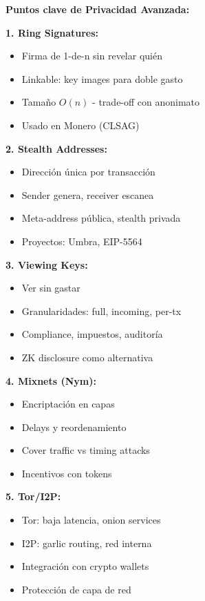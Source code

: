 \documentclass[11pt,a4paper,twoside]{book}
\begin{document}
\begin{keyidea}
\textbf{Puntos clave de Privacidad Avanzada:}

\textbf{1. Ring Signatures:}
\begin{itemize}
    \item Firma de 1-de-n sin revelar qui\'en
    \item Linkable: key images para doble gasto
    \item Tama\~no $O(n)$ - trade-off con anonimato
    \item Usado en Monero (CLSAG)
\end{itemize}

\textbf{2. Stealth Addresses:}
\begin{itemize}
    \item Direcci\'on \'unica por transacci\'on
    \item Sender genera, receiver escanea
    \item Meta-address p\'ublica, stealth privada
    \item Proyectos: Umbra, EIP-5564
\end{itemize}

\textbf{3. Viewing Keys:}
\begin{itemize}
    \item Ver sin gastar
    \item Granularidades: full, incoming, per-tx
    \item Compliance, impuestos, auditor\'ia
    \item ZK disclosure como alternativa
\end{itemize}

\textbf{4. Mixnets (Nym):}
\begin{itemize}
    \item Encriptaci\'on en capas
    \item Delays y reordenamiento
    \item Cover traffic vs timing attacks
    \item Incentivos con tokens
\end{itemize}

\textbf{5. Tor/I2P:}
\begin{itemize}
    \item Tor: baja latencia, onion services
    \item I2P: garlic routing, red interna
    \item Integraci\'on con crypto wallets
    \item Protecci\'on de capa de red
\end{itemize}


\end{keyidea}
\end{document}
